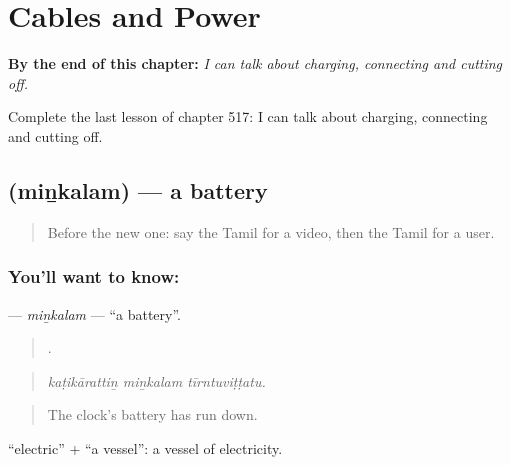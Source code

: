 
\chapter{Cables and Power}
\label{ch:ta-cables-and-power}

\begin{chapteropening}
\textbf{By the end of this chapter:} \emph{I can talk about charging, connecting and cutting off.}

Complete the last lesson of chapter 517: I can talk about charging, connecting and cutting off.
\end{chapteropening}

\section[\texorpdfstring{\ta{மின்கலம்} (miṉkalam)}{மின்கலம் (miṉkalam)}]{ (miṉkalam) — a battery}

\label{lesson:TA-C517-minkalam}



\begin{quote}
Before the new one: say the Tamil for a video, then the Tamil for a user.
\end{quote}

\subsection*{You'll want to know: }
\textbf{} — \emph{miṉkalam} — \textquotedblleft{}a battery\textquotedblright{}.

\begin{quote}
  .
\end{quote}

\begin{quote}
\emph{kaṭikārattiṉ miṉkalam tīrntuviṭṭatu.}
\end{quote}

\begin{quote}
The clock's battery has run down.
\end{quote}

 \textquotedblleft{}electric\textquotedblright{} +  \textquotedblleft{}a vessel\textquotedblright{}: a vessel of electricity.

